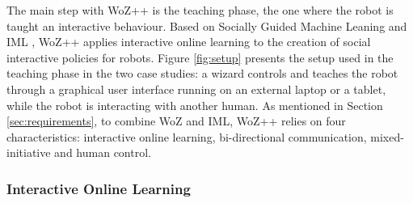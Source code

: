\documentclass[manuscript, review, anonymous]{acmart}
\newcommand{\ES}[1]{\added[id=ES]{#1}}
\newcommand{\woz}{WoZ++\xspace}
\begin{document}

The main step with \woz is the teaching phase, the one where
the robot is taught an interactive behaviour. Based on Socially Guided Machine
Leaning \cite{thomaz2008teachable} and IML \cite{amershi2014power}, \woz applies
interactive online learning to the creation of social interactive policies for
robots. Figure \ref{fig:setup} presents the setup used in the teaching phase in
the two case studies: a wizard controls and teaches the robot through a graphical user
interface running on an external laptop or a tablet, while the robot is
interacting with another human. As mentioned in Section \ref{sec:requirements}, to combine WoZ and IML, \woz relies on four characteristics: interactive online learning, bi-directional communication, mixed-initiative and human control.






\subsubsection{Interactive Online Learning}
\end{document}
